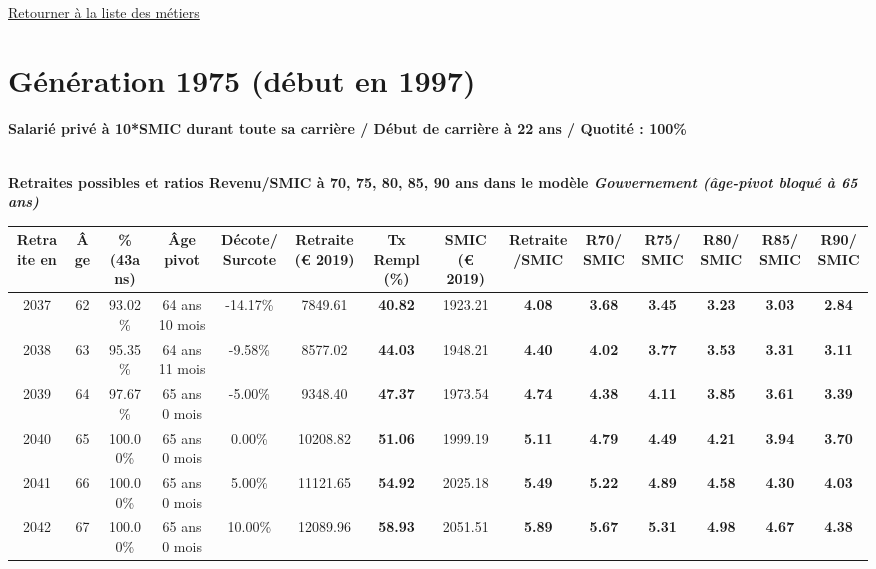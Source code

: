 

   
 \localtableofcontents 

~\\ 
 
 \hyperlink{page.2}{\noindent Retourner à la liste des métiers}

 \newpage 

\section{Génération 1975 (début en 1997)\label{10SMIC_100_1975_22_0}} 
 
{\bf \noindent Salarié privé à 10*SMIC durant toute sa carrière / Début de carrière à 22 ans / Quotité : 100\%}  ~ 

 ~\\{\bf \noindent Retraites possibles et ratios Revenu/SMIC à 70, 75, 80, 85, 90 ans dans le modèle \emph{Gouvernement (âge-pivot bloqué à 65 ans)}}  
 
\begin{adjustbox}{max width=\textwidth} 
\begin{tabular}[htb]{|c|c||c|c|c||c|c||c|c||c|c|c|c|c|} 
\hline 
 Retraite en &  Âge &  \%(43ans) &  Âge pivot &  Décote/Surcote &  Retraite (\euro{} 2019) &  Tx Rempl(\%) &  SMIC (\euro{} 2019) &  Retraite/SMIC &  R70/SMIC &  R75/SMIC &  R80/SMIC &  R85/SMIC &  R90/SMIC \\ 
\hline \hline 
 2037 &  62 &  93.02\% &  64 ans 10 mois &  -14.17\% &  7849.61 &  {\bf 40.82} &  1923.21 &  {\bf 4.08} &  {\bf 3.68} &  {\bf 3.45} &  {\bf 3.23} &  {\bf 3.03} &  {\bf 2.84} \\ 
\hline 
 2038 &  63 &  95.35\% &  64 ans 11 mois &  -9.58\% &  8577.02 &  {\bf 44.03} &  1948.21 &  {\bf 4.40} &  {\bf 4.02} &  {\bf 3.77} &  {\bf 3.53} &  {\bf 3.31} &  {\bf 3.11} \\ 
\hline 
 2039 &  64 &  97.67\% &  65 ans 0 mois &  -5.00\% &  9348.40 &  {\bf 47.37} &  1973.54 &  {\bf 4.74} &  {\bf 4.38} &  {\bf 4.11} &  {\bf 3.85} &  {\bf 3.61} &  {\bf 3.39} \\ 
\hline 
 2040 &  65 &  100.00\% &  65 ans 0 mois &  0.00\% &  10208.82 &  {\bf 51.06} &  1999.19 &  {\bf 5.11} &  {\bf 4.79} &  {\bf 4.49} &  {\bf 4.21} &  {\bf 3.94} &  {\bf 3.70} \\ 
\hline 
 2041 &  66 &  100.00\% &  65 ans 0 mois &  5.00\% &  11121.65 &  {\bf 54.92} &  2025.18 &  {\bf 5.49} &  {\bf 5.22} &  {\bf 4.89} &  {\bf 4.58} &  {\bf 4.30} &  {\bf 4.03} \\ 
\hline 
 2042 &  67 &  100.00\% &  65 ans 0 mois &  10.00\% &  12089.96 &  {\bf 58.93} &  2051.51 &  {\bf 5.89} &  {\bf 5.67} &  {\bf 5.31} &  {\bf 4.98} &  {\bf 4.67} &  {\bf 4.38} \\ 
\hline 
\hline 
\end{tabular} 
\end{adjustbox} 
 
